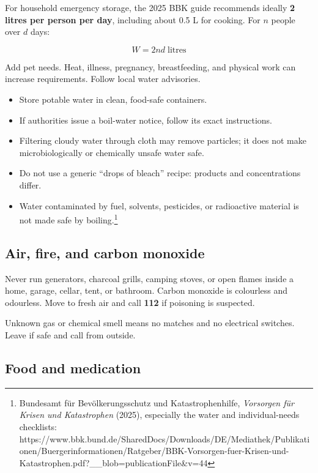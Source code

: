 For household emergency storage, the 2025 BBK guide recommends ideally
\textbf{2 litres per person per day}, including about 0.5 L for cooking.
For \(n\) people over \(d\) days:

\[W = 2nd\;\text{litres}\]

Add pet needs. Heat, illness, pregnancy, breastfeeding, and physical
work can increase requirements. Follow local water advisories.

\begin{itemize}
\tightlist
\item
  Store potable water in clean, food-safe containers.
\item
  If authorities issue a boil-water notice, follow its exact
  instructions.
\item
  Filtering cloudy water through cloth may remove particles; it does not
  make microbiologically or chemically unsafe water safe.
\item
  Do not use a generic ``drops of bleach'' recipe: products and
  concentrations differ.
\item
  Water contaminated by fuel, solvents, pesticides, or radioactive
  material is not made safe by boiling.\footnote{Bundesamt für
    Bevölkerungsschutz und Katastrophenhilfe, \emph{Vorsorgen für Krisen
    und Katastrophen} (2025), especially the water and individual-needs
    checklists:
    https://www.bbk.bund.de/SharedDocs/Downloads/DE/Mediathek/Publikationen/Buergerinformationen/Ratgeber/BBK-Vorsorgen-fuer-Krisen-und-Katastrophen.pdf?\_\_blob=publicationFile\&v=44}
\end{itemize}

\hypertarget{air-fire-and-carbon-monoxide}{%
\subsection{Air, fire, and carbon
monoxide}\label{air-fire-and-carbon-monoxide}}

Never run generators, charcoal grills, camping stoves, or open flames
inside a home, garage, cellar, tent, or bathroom. Carbon monoxide is
colourless and odourless. Move to fresh air and call \textbf{112} if
poisoning is suspected.

Unknown gas or chemical smell means no matches and no electrical
switches. Leave if safe and call from outside.

\hypertarget{food-and-medication}{%
\subsection{Food and medication}\label{food-and-medication}}

